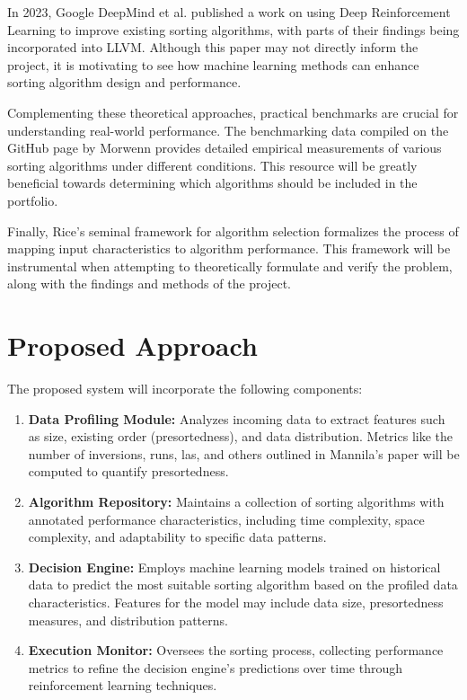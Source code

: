 \documentclass[twocolumn]{article}
\begin{document}
In 2023, Google DeepMind et al. \cite{alphadev} published a work on using Deep Reinforcement Learning to improve existing sorting algorithms, with parts of their findings being incorporated into LLVM. Although this paper may not directly inform the project, it is motivating to see how machine learning methods can enhance sorting algorithm design and performance.

Complementing these theoretical approaches, practical benchmarks are crucial for understanding real-world performance. The benchmarking data compiled on the GitHub page by Morwenn \cite{cppsort_benchmarks} provides detailed empirical measurements of various sorting algorithms under different conditions. This resource will be greatly beneficial towards determining which algorithms should be included in the portfolio.

Finally, Rice’s seminal framework for algorithm selection \cite{ricealgorithmselection} formalizes the process of mapping input characteristics to algorithm performance. This framework will be instrumental when attempting to theoretically formulate and verify the problem, along with the findings and methods of the project.

\section{Proposed Approach}
The proposed system will incorporate the following components:
\begin{enumerate}
    \item \textbf{Data Profiling Module:} Analyzes incoming data to extract features such as size, existing order (presortedness), and data distribution. Metrics like the number of inversions, runs, las, and others outlined in Mannila's \cite{Mannila1985MeasuresOP} paper will be computed to quantify presortedness.
    \item \textbf{Algorithm Repository:} Maintains a collection of sorting algorithms with annotated performance characteristics, including time complexity, space complexity, and adaptability to specific data patterns.
    \item \textbf{Decision Engine:} Employs machine learning models trained on historical data to predict the most suitable sorting algorithm based on the profiled data characteristics. Features for the model may include data size, presortedness measures, and distribution patterns.
    \item \textbf{Execution Monitor:} Oversees the sorting process, collecting performance metrics to refine the decision engine's predictions over time through reinforcement learning techniques.
\end{enumerate}
\end{document}
